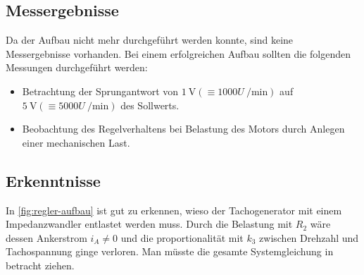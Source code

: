 \subsection{Messergebnisse}

Da der Aufbau nicht mehr durchgeführt werden konnte, sind keine Messergebnisse vorhanden. Bei einem erfolgreichen Aufbau sollten die folgenden Messungen durchgeführt werden:

\begin{itemize}[noitemsep]
	\item Betrachtung der Sprungantwort von $\SI{1}{\volt} (\equiv 1000 U~\si{\per\minute})$ auf $\SI{5}{\volt}(\equiv 5000 U~\si{\per\minute})$ des Sollwerts.
	\item Beobachtung des Regelverhaltens bei Belastung des Motors durch Anlegen einer mechanischen Last.
\end{itemize}

\subsection{Erkenntnisse}

In \autoref{fig:regler-aufbau} ist gut zu erkennen, wieso der Tachogenerator mit einem Impedanzwandler entlastet werden muss. Durch die Belastung mit $R_2$ wäre dessen Ankerstrom $i_A\neq 0$ und die proportionalität mit $k_3$ zwischen Drehzahl und Tachospannung ginge verloren. Man müsste die gesamte Systemgleichung \cite[S.~133, Gl.~6.14]{EMTPraktikum2025} in betracht ziehen.